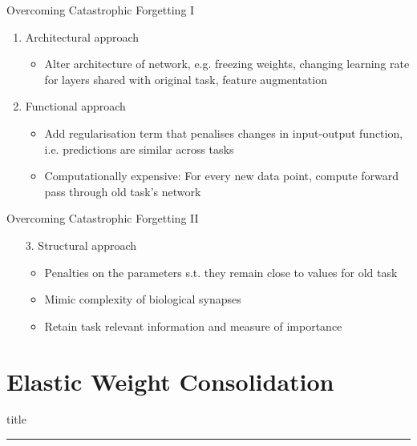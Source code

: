 \documentclass{beamer}
\begin{document}
\begin{frame}{Overcoming Catastrophic Forgetting I}
\begin{enumerate}
	\item<1-> Architectural approach
	\begin{itemize}
		\item<1-> Alter architecture of network, e.g. freezing weights, changing learning rate for layers shared with original task, feature augmentation
	\end{itemize}
	\item<2-> Functional approach
	\begin{itemize}
		\item Add regularisation term that penalises changes in input-output function, i.e. predictions are similar across tasks
		\item Computationally expensive: For every new data point, compute forward pass through old task's network
		
	\end{itemize}


\end{enumerate}
\end{frame}
\begin{frame}{Overcoming Catastrophic Forgetting II}
	\begin{enumerate}
		\item[3.] Structural approach
		\begin{itemize}
			\item Penalties on the parameters s.t. they remain close to values for old task
			\item Mimic complexity of biological synapses
			\item Retain task relevant information and measure of importance
		\end{itemize} 
	\end{enumerate}
\end{frame}





\section{Elastic Weight Consolidation}
    \begin{frame}[plain]
        \vfill
      \centering
      \begin{beamercolorbox}[sep=8pt,center,shadow=true,rounded=true]{title}
        \insertsectionhead\par%
        \color{oxfordblue}\noindent\rule{10cm}{1pt} 
        
      \end{beamercolorbox}
      \vfill
  \end{frame}
  
\end{document}
